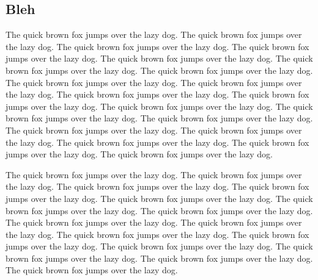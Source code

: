\documentclass{refcard}
\begin{document}
\subsection{Bleh}

The quick brown fox jumps over the lazy dog.
The quick brown fox jumps over the lazy dog.
The quick brown fox jumps over the lazy dog.
The quick brown fox jumps over the lazy dog.
The quick brown fox jumps over the lazy dog.
The quick brown fox jumps over the lazy dog.
The quick brown fox jumps over the lazy dog.
The quick brown fox jumps over the lazy dog.
The quick brown fox jumps over the lazy dog.
The quick brown fox jumps over the lazy dog.
The quick brown fox jumps over the lazy dog.
The quick brown fox jumps over the lazy dog.
The quick brown fox jumps over the lazy dog.
The quick brown fox jumps over the lazy dog.
The quick brown fox jumps over the lazy dog.
The quick brown fox jumps over the lazy dog.
The quick brown fox jumps over the lazy dog.
The quick brown fox jumps over the lazy dog.
The quick brown fox jumps over the lazy dog.

The quick brown fox jumps over the lazy dog.
The quick brown fox jumps over the lazy dog.
The quick brown fox jumps over the lazy dog.
The quick brown fox jumps over the lazy dog.
The quick brown fox jumps over the lazy dog.
The quick brown fox jumps over the lazy dog.
The quick brown fox jumps over the lazy dog.
The quick brown fox jumps over the lazy dog.
The quick brown fox jumps over the lazy dog.
The quick brown fox jumps over the lazy dog.
The quick brown fox jumps over the lazy dog.
The quick brown fox jumps over the lazy dog.
The quick brown fox jumps over the lazy dog.
The quick brown fox jumps over the lazy dog.
The quick brown fox jumps over the lazy dog.
\end{document}
